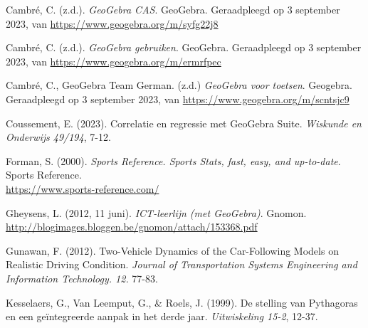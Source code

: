  \begin{bronnen}

\item Cambré, C. (z.d.). \emph{GeoGebra CAS}. GeoGebra. Geraadpleegd op 3 september 2023, van \url{https://www.geogebra.org/m/syfg22j8}

\item Cambré, C. (z.d.). \emph{GeoGebra gebruiken}. GeoGebra. Geraadpleegd op 3 september 2023, van \url{https://www.geogebra.org/m/ermrfpec}


\item Cambré, C., GeoGebra Team German.  (z.d.) \emph{GeoGebra voor toetsen}. Geogebra. Geraadpleegd op 3 september 2023, van \url{https://www.geogebra.org/m/scntsjc9}

\item Coussement, E. (2023). Correlatie en regressie met GeoGebra Suite. \emph{Wiskunde en Onderwijs 49/194}, 7-12.

\item Forman, S. (2000). \emph{Sports Reference. Sports Stats, fast, easy, and up-to-date}. Sports Reference.\\ \url{https://www.sports-reference.com/}

 \item Gheysens, L. (2012, 11 juni). \emph{ICT-leerlijn (met GeoGebra)}. Gnomon. \url{http://blogimages.bloggen.be/gnomon/attach/153368.pdf}

\item Gunawan, F. (2012). Two-Vehicle Dynamics of the Car-Following Models on Realistic Driving Condition. \emph{Journal of Transportation Systems Engineering and Information Technology. 12.} 77-83.



\item Kesselaers, G., Van Leemput, G., \& Roels, J. (1999). De stelling van Pythagoras en een geïntegreerde aanpak in het derde jaar. \emph{Uitwiskeling 15-2}, 12-37.



 \end{bronnen}



